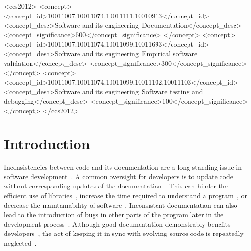 \documentclass[acmsmall, screen]{acmart}
\begin{document}
\begin{CCSXML}
<ccs2012>
   <concept>
       <concept_id>10011007.10011074.10011111.10010913</concept_id>
       <concept_desc>Software and its engineering~Documentation</concept_desc>
       <concept_significance>500</concept_significance>
       </concept>
   <concept>
       <concept_id>10011007.10011074.10011099.10011693</concept_id>
       <concept_desc>Software and its engineering~Empirical software validation</concept_desc>
       <concept_significance>300</concept_significance>
       </concept>
   <concept>
       <concept_id>10011007.10011074.10011099.10011102.10011103</concept_id>
       <concept_desc>Software and its engineering~Software testing and debugging</concept_desc>
       <concept_significance>100</concept_significance>
       </concept>
 </ccs2012>
\end{CCSXML}



\maketitle

\section{Introduction}
Inconsistencies between code and its documentation are a long-standing issue in software development~\cite{rani2023decade, tan2007icomment, reiss2006incremental}. A common oversight for developers is to update code without corresponding updates of the documentation~\cite{ratol2017detecting}. 
This can hinder the efficient use of libraries~\cite{uddin2015api}, increase the time required to understand a program~\cite{xia2017measuring}, or decrease the maintainability of software~\cite{lenhard2019exploring, de2005study}. Inconsistent %
documentation can also lead to the introduction of bugs in other parts of the program later in the development process~\cite{zhong2009inferring}. Although good documentation demonstrably benefits developers~\cite{xia2017measuring}, the act of keeping it in sync with evolving source code is repeatedly neglected~\cite{summaryzhu2019automatic}. 
\end{document}
